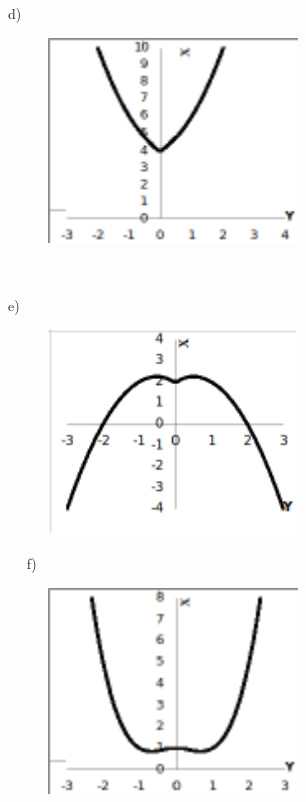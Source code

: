 \begin{respostas}{7}
~~

	d)

	\begin{figure}[H]
		\begin{Center}
			\includegraphics[width=2.6in,height=2.15in]{capitulos/outras_funcoes/media/image98.pdf}
		\end{Center}
	\end{figure}

~~

	e)

	\begin{figure}[H]
		\begin{Center}
			\includegraphics[width=2.6in,height=2.15in]{capitulos/outras_funcoes/media/image99.pdf}
		\end{Center}
	\end{figure}

~~
	f)

	\begin{figure}[H]
		\begin{Center}
			\includegraphics[width=2.6in,height=2.15in]{capitulos/outras_funcoes/media/image100.pdf}
		\end{Center}
	\end{figure}

\end{respostas}

